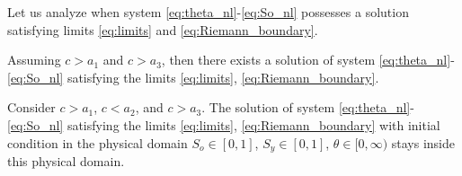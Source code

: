 
Let us analyze when system \eqref{eq:theta_nl}-\eqref{eq:So_nl} possesses a solution satisfying limits \eqref{eq:limits} and \eqref{eq:Riemann_boundary}.
\begin{theorem}
	\label{teo4_nl}
	Assuming $c > a_1$ and $c > a_3$, then there exists a solution of system \eqref{eq:theta_nl}-\eqref{eq:So_nl} satisfying the limits \eqref{eq:limits}, \eqref{eq:Riemann_boundary}.
\end{theorem}

\begin{theorem}
	\label{t:domain_nl}
	Consider $c > a_1$, $c < a_2$, and $c > a_3$. The solution of system \eqref{eq:theta_nl}-\eqref{eq:So_nl} satisfying the limits \eqref{eq:limits}, \eqref{eq:Riemann_boundary} with initial condition in the physical domain $S_o\in [0,1]$, $S_y\in [0,1]$, $\theta\in [0,\infty)$ stays inside this physical domain.
\end{theorem}

